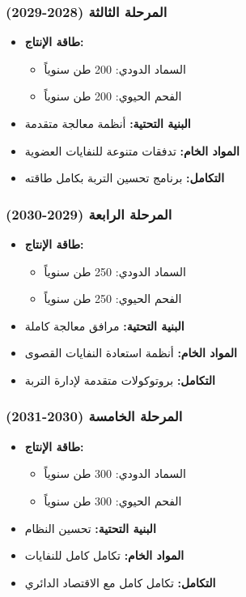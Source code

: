 \subsubsection{المرحلة الثالثة (2028-2029)}
\begin{itemize}
    \item \textbf{طاقة الإنتاج:}
    \begin{itemize}
        \item السماد الدودي: 200 طن سنوياً
        \item الفحم الحيوي: 200 طن سنوياً
    \end{itemize}
    \item \textbf{البنية التحتية:} أنظمة معالجة متقدمة
    \item \textbf{المواد الخام:} تدفقات متنوعة للنفايات العضوية
    \item \textbf{التكامل:} برنامج تحسين التربة بكامل طاقته
\end{itemize}

\subsubsection{المرحلة الرابعة (2029-2030)}
\begin{itemize}
    \item \textbf{طاقة الإنتاج:}
    \begin{itemize}
        \item السماد الدودي: 250 طن سنوياً
        \item الفحم الحيوي: 250 طن سنوياً
    \end{itemize}
    \item \textbf{البنية التحتية:} مرافق معالجة كاملة
    \item \textbf{المواد الخام:} أنظمة استعادة النفايات القصوى
    \item \textbf{التكامل:} بروتوكولات متقدمة لإدارة التربة
\end{itemize}

\subsubsection{المرحلة الخامسة (2030-2031)}
\begin{itemize}
    \item \textbf{طاقة الإنتاج:}
    \begin{itemize}
        \item السماد الدودي: 300 طن سنوياً
        \item الفحم الحيوي: 300 طن سنوياً
    \end{itemize}
    \item \textbf{البنية التحتية:} تحسين النظام
    \item \textbf{المواد الخام:} تكامل كامل للنفايات
    \item \textbf{التكامل:} تكامل كامل مع الاقتصاد الدائري
\end{itemize}
